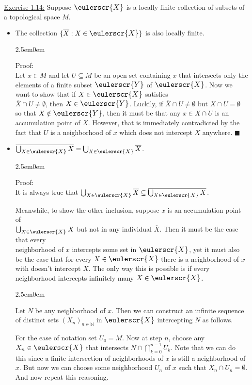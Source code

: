 \documentclass{book}
\newcommand{\mathcalli}[1]{\text{\scalebox{1.11}{$\eulerscr{#1}$}}}
\newcommand{\pracTwo}{
   \color{Orange}%
   \fontsize{12}{14}\selectfont%
}
\newenvironment{myIndent}{%
   \begin{adjustwidth}{2.5em}{0em}%
}{%
   \end{adjustwidth}%
}
\newcommand{\retTwo}{\hfill\bigbreak}
\begin{document}
\ul{Exercise 1.14:} Suppose $\mathcalli{X}$ is a locally finite collection of subsets of a topological space $M$.
\begin{itemize}
	\item[(a)] The collection $\{\overline{X} : X \in \mathcalli{X}\}$ is also locally finite.
	\begin{myIndent}\pracTwo
		Proof:\\
		Let $x \in M$ and let $U \subseteq M$ be an open set containing $x$ that intersects only the\\ elements of a finite subset $\mathcalli{Y}$ of $\mathcalli{X}$. Now we want to show that if $X \in \mathcalli{X}$ satisfies\\ $\overline{X} \cap U \neq \emptyset$, then $X \in \mathcalli{Y}$. Luckily, if $\overline{X} \cap U \neq \emptyset$ but $X \cap U = \emptyset$ so that $X \notin \mathcalli{Y}$, then it must be that any $x \in \overline{X} \cap U$ is an accumulation point of $X$. However, that is immediately contradicted by the fact that $U$ is a neighborhood of $x$ which does not intercept $X$ anywhere. $\blacksquare$\retTwo	
	\end{myIndent}
	
	\item[(b)] $\overline{\bigcup_{X \in \mathcalli{X}} X} = \bigcup_{X \in \mathcalli{X}} \overline{X}$.
	
	\begin{myIndent}\pracTwo
		Proof:\\
		It is always true that $\bigcup_{X \in \mathcalli{X}} \overline{X} \subseteq \overline{\bigcup_{X \in \mathcalli{X}} X}$.\retTwo

		Meanwhile, to show the other inclusion, suppose $x$ is an accumulation point of\\ $\bigcup_{X \in \mathcalli{X}} X$ but not in any individual $\overline{X}$. Then it must be the case that every\\ neighborhood of $x$ intercepts some set in $\mathcalli{X}$, yet it must also be the case that for every $X \in \mathcalli{X}$ there is a neighborhood of $x$ with doesn't intercept $X$. The only way this is possible is if every neighborhood intercepts infinitely many $X \in \mathcalli{X}$.
		\begin{myIndent}
			Let $N$ be any neighborhood of $x$. Then we can construct an infinite sequence of distinct sets $(X_n)_{n \in \mathbb{N}}$ in $\mathcalli{X}$ intercepting $N$ as follows.\retTwo

			For the ease of notation set $U_0 = M$. Now at step $n$, choose any $X_n \in \mathcalli{X}$ that intersects $N \cap \bigcap_{k=0}^{n-1} U_k$. Note that we can do this since a finite intersection of neighborhoods of $x$ is still a neighborhood of $x$. But now we can choose some neighborhood $U_{n}$ of $x$ such that $X_n \cap U_n = \emptyset$. And now repeat this reasoning.\retTwo


\end{myIndent}
\end{myIndent}
\end{itemize}
\end{document}
